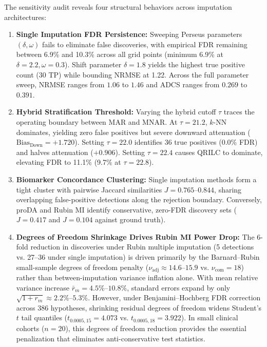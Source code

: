 \documentclass[11pt,oneside]{book}
\begin{document}
The sensitivity audit reveals four structural behaviors across imputation architectures:
\begin{enumerate}
    \item \textbf{Single Imputation FDR Persistence:} Sweeping Perseus parameters $(\delta, \omega)$ fails to eliminate false discoveries, with empirical FDR remaining between 6.9\% and 10.3\% across all grid points (minimum 6.9\% at $\delta = 2.2, \omega = 0.3$). Shift parameter $\delta = 1.8$ yields the highest true positive count (30 TP) while bounding NRMSE at 1.22. Across the full parameter sweep, NRMSE ranges from $1.06$ to $1.46$ and ADCS ranges from $0.269$ to $0.391$.
    \item \textbf{Hybrid Stratification Threshold:} Varying the hybrid cutoff $\tau$ traces the operating boundary between MAR and MNAR. At $\tau = 21.2$, $k$-NN dominates, yielding zero false positives but severe downward attenuation ($\text{Bias}_{\text{Down}} = +1.720$). Setting $\tau = 22.0$ identifies 36 true positives (0.0\% FDR) and halves attenuation ($+0.906$). Setting $\tau = 22.4$ causes QRILC to dominate, elevating FDR to 11.1\% (9.7\% at $\tau = 22.8$).
    \item \textbf{Biomarker Concordance Clustering:} Single imputation methods form a tight cluster with pairwise Jaccard similarities $J = 0.765$--$0.844$, sharing overlapping false-positive detections along the rejection boundary. Conversely, proDA and Rubin MI identify conservative, zero-FDR discovery sets ($J = 0.417$ and $J = 0.104$ against ground truth).
    \item \textbf{Degrees of Freedom Shrinkage Drives Rubin MI Power Drop:} The 6-fold reduction in discoveries under Rubin multiple imputation (5 detections vs. 27--36 under single imputation) is driven primarily by the Barnard--Rubin small-sample degrees of freedom penalty ($\nu_{\text{adj}} \approx 14.6$--$15.9$ vs. $\nu_{\text{com}} = 18$) rather than between-imputation variance inflation alone. With mean relative variance increase $\bar{r}_m = 4.5\%$--$10.8\%$, standard errors expand by only $\sqrt{1 + r_m} \approx 2.2\%$--$5.3\%$. However, under Benjamini--Hochberg FDR correction across 386 hypotheses, shrinking residual degrees of freedom widens Student's $t$ tail quantiles ($t_{0.0005, 15} = 4.073$ vs. $t_{0.0005, 18} = 3.922$). In small clinical cohorts ($n = 20$), this degrees of freedom reduction provides the essential penalization that eliminates anti-conservative test statistics.
\end{enumerate}
\end{document}
